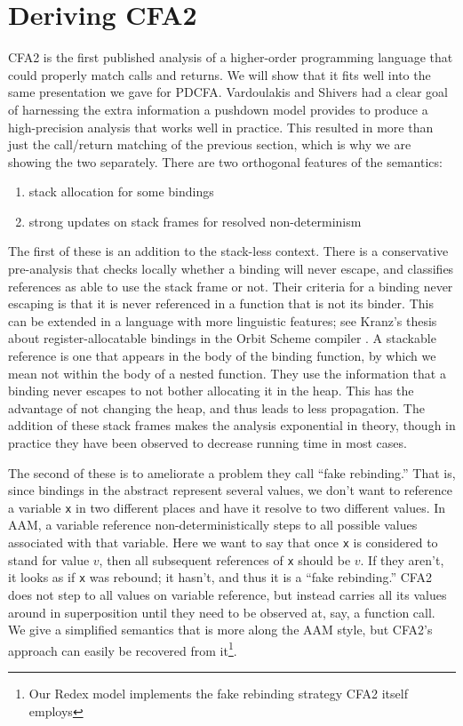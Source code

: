 \documentclass{llncs}
\begin{document}
\section{Deriving CFA2}
\label{sec:cfa2}

CFA2 is the first published analysis of a higher-order programming
language that could properly match calls and returns. We will show
that it fits well into the same presentation we gave for
PDCFA. Vardoulakis and Shivers had a clear goal of harnessing the
extra information a pushdown model provides to produce a
high-precision analysis that works well in practice. This resulted in
more than just the call/return matching of the previous section, which
is why we are showing the two separately. There are two orthogonal
features of the semantics:
\begin{enumerate}
\item{stack allocation for some bindings}
\item{strong updates on stack frames for resolved non-determinism}
\end{enumerate}
The first of these is an addition to the stack-less context. There is a
conservative pre-analysis that checks locally whether a binding will
never escape, and classifies references as able to use the stack frame
or not. Their criteria for a binding never escaping is that it is
never referenced in a function that is not its binder. This can be
extended in a language with more linguistic features; see Kranz's
thesis about register-allocatable bindings in the Orbit Scheme
compiler \citep{ianjohnson:kranz:thesis:1988}. A stackable reference
is one that appears in the body of the binding function, by which we
mean not within the body of a nested function. They use the information
that a binding never escapes to not bother allocating it in the
heap. This has the advantage of not changing the heap, and thus leads
to less propagation. The addition of these stack frames makes the
analysis exponential in theory, though in practice they have been
observed to decrease running time in most cases.

The second of these is to ameliorate a problem they call ``fake
rebinding.'' That is, since bindings in the abstract represent several
values, we don't want to reference a variable \texttt{x} in two
different places and have it resolve to two different values. In AAM,
a variable reference non-deterministically steps to all possible
values associated with that variable. Here we want to say that once
\texttt{x} is considered to stand for value $v$, then all subsequent
references of \texttt{x} should be $v$. If they aren't, it looks as if
\texttt{x} was rebound; it hasn't, and thus it is a ``fake
rebinding.'' CFA2 does not step to all values on variable reference,
but instead carries all its values around in superposition until they
need to be observed at, say, a function call. We give a simplified
semantics that is more along the AAM style, but CFA2's approach can
easily be recovered from it\footnote{Our Redex model implements the
  fake rebinding strategy CFA2 itself employs}.
\end{document}
